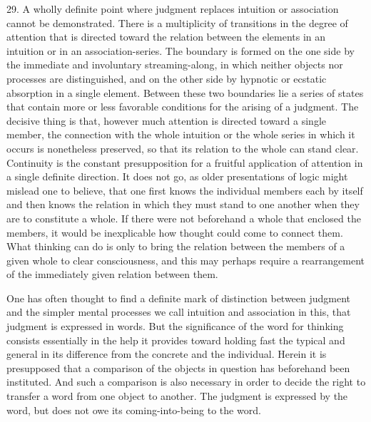 \documentclass[12pt,a4paper]{book}
\newcommand{\opage}[1]{\marginnote{\footnotesize\textit{[#1]}}}
\begin{document}
29. A wholly definite point where judgment replaces intuition or
association cannot be demonstrated. There is a multiplicity of transitions
in the degree of attention that is directed toward the relation between
the elements in an intuition or in an association-series. The boundary is
formed on the one side by the immediate and involuntary streaming-along,
in which neither objects nor processes are distinguished, and on the other
side by hypnotic or ecstatic absorption in a single element. Between these
two boundaries lie a series of states that contain more or less favorable
conditions for the arising of a judgment. The decisive thing is that,
however much attention is directed toward a single member, the connection
with the whole intuition or the whole series in which it occurs is
nonetheless preserved, so that its relation to the whole \opage{83}can stand clear.
Continuity is the constant presupposition for a fruitful application of
attention in a single definite direction. It does not go, as older
presentations of logic might mislead one to believe, that one first knows
the individual members each by itself and then knows the relation in which
they must stand to one another when they are to constitute a whole. If
there were not beforehand a whole that enclosed the members, it would be
inexplicable how thought could come to connect them. What thinking can do
is only to bring the relation between the members of a given whole to
clear consciousness, and this may perhaps require a rearrangement of the
immediately given relation between them.

One has often thought to find a definite mark of distinction between
judgment and the simpler mental processes we call intuition and
association in this, that judgment is expressed in words. But the
significance of the word for thinking consists essentially in the help it
provides toward holding fast the typical and general in its difference
from the concrete and the individual. Herein it is presupposed that a
comparison of the objects in question has beforehand been instituted. And
such a comparison is also necessary in order to decide the right to
transfer a word from one object to another. The judgment is expressed by
the word, but does not owe its coming-into-being to the word.
\end{document}
